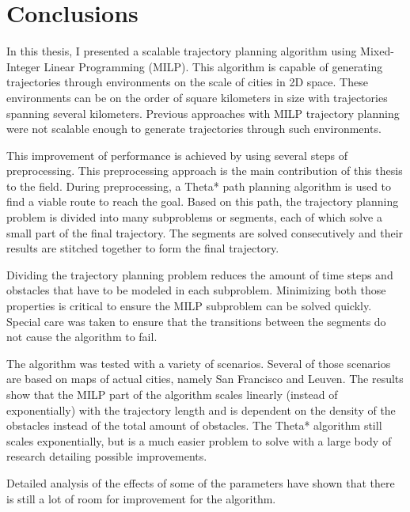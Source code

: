 

\chapter{Conclusions}
\label{section:conclusions}
In this thesis, I presented a scalable trajectory planning algorithm using Mixed-Integer Linear Programming (MILP). This algorithm is capable of generating trajectories through environments on the scale of cities in 2D space. These environments can be on the order of square kilometers in size with trajectories spanning several kilometers. Previous approaches with MILP trajectory planning were not scalable enough to generate trajectories through such environments.
\par
This improvement of performance is achieved by using several steps of preprocessing. This preprocessing approach is the main contribution of this thesis to the field. During preprocessing, a Theta* path planning algorithm is used to find a viable route to reach the goal. Based on this path, the trajectory planning problem is divided into many subproblems or segments, each of which solve a small part of the final trajectory. The segments are solved consecutively and their results are stitched together to form the final trajectory.
\par
Dividing the trajectory planning problem reduces the amount of time steps and obstacles that have to be modeled in each subproblem. Minimizing both those properties is critical to ensure the MILP subproblem can be solved quickly. Special care was taken to ensure that the transitions between the segments do not cause the algorithm to fail.
\par
The algorithm was tested with a variety of scenarios. Several of those scenarios are based on maps of actual cities, namely San Francisco and Leuven. The results show that the MILP part of the algorithm scales linearly (instead of exponentially) with the trajectory length and is dependent on the density of the obstacles instead of the total amount of obstacles. The Theta* algorithm still scales exponentially, but is a much easier problem to solve with a large body of research detailing possible improvements.
\par
Detailed analysis of the effects of some of the parameters have shown that there is still a lot of room for improvement for the algorithm. 


